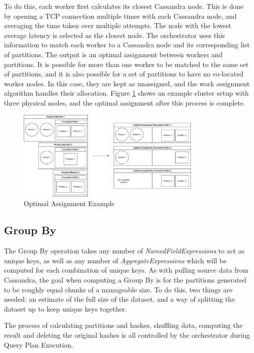 To do this, each worker first calculates its closest Cassandra node. This is done by opening a TCP connection multiple times with each Cassandra node, and averaging the time taken over multiple attempts. The node with the lowest average latency is selected as the closest node. The orchestrator uses this information to match each worker to a Cassandra node and its corresponding list of partitions. The output is an optimal assignment between workers and partitions. It is possible for more than one worker to be matched to the same set of partitions, and it is also possible for a set of partitions to have no co-located worker nodes. In this case, they are kept as unassigned, and the work assignment algorithm handles their allocation. Figure \ref{fig:optimal-assignment-example} shows an example cluster setup with three physical nodes, and the optimal assignment after this process is complete.

\begin{figure}[h]
	\centering
	\includegraphics[width=0.8\textwidth]{chapters/diagrams/implementation/optimal-assignment-example}
	\caption{Optimal Assignment Example}
	\label{fig:optimal-assignment-example}
\end{figure}

\subsection{Group By}\label{subsec:group-by}
The Group By operation takes any number of \textit{NamedFieldExpressions} to act as unique keys, as well as any number of \textit{AggregateExpressions} which will be computed for each combination of unique keys. As with pulling source data from Cassandra, the goal when computing a Group By is for the partitions generated to be roughly equal chunks of a manageable size. To do this, two things are needed: an estimate of the full size of the dataset, and a way of splitting the dataset up to keep unique keys together. 

The process of calculating partitions and hashes, shuffling data, computing the result and deleting the original hashes is all controlled by the orchestrator during Query Plan Execution.

